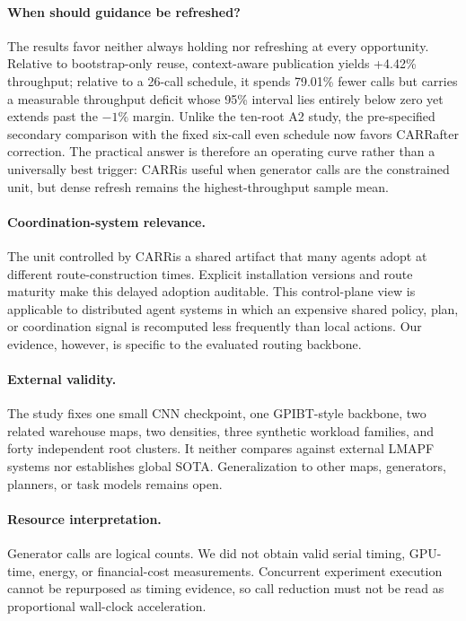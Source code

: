 \documentclass[sigconf,anonymous,review]{acmart}
\newcommand{\carr}{\textsc{CARR}}
\begin{document}
\paragraph{When should guidance be refreshed?}
The results favor neither always holding nor refreshing at every opportunity.
Relative to bootstrap-only reuse, context-aware publication yields +4.42\%
throughput; relative to a 26-call schedule, it spends 79.01\% fewer calls but
carries a measurable throughput deficit whose 95\% interval lies entirely
below zero yet extends past the $-1\%$ margin. Unlike the ten-root A2 study,
the pre-specified secondary comparison with the fixed six-call even schedule
now favors \carr after correction. The practical answer is therefore an
operating curve rather than a universally best trigger: \carr is useful when
generator calls are the constrained unit, but dense refresh remains the
highest-throughput sample mean.

\paragraph{Coordination-system relevance.}
The unit controlled by \carr is a shared artifact that many agents adopt at
different route-construction times. Explicit installation versions and route
maturity make this delayed adoption auditable. This control-plane view is
applicable to distributed agent systems in which an expensive shared policy,
plan, or coordination signal is recomputed less frequently than local actions.
Our evidence, however, is specific to the evaluated routing backbone.

\paragraph{External validity.}
The study fixes one small CNN checkpoint, one GPIBT-style backbone, two related
warehouse maps, two densities, three synthetic workload families, and forty
independent root clusters. It neither compares against external LMAPF systems
nor establishes global SOTA. Generalization to other maps, generators,
planners, or task models remains open.

\paragraph{Resource interpretation.}
Generator calls are logical counts. We did not obtain valid serial timing,
GPU-time, energy, or financial-cost measurements. Concurrent experiment
execution cannot be repurposed as timing evidence, so call reduction must not
be read as proportional wall-clock acceleration.
\end{document}
